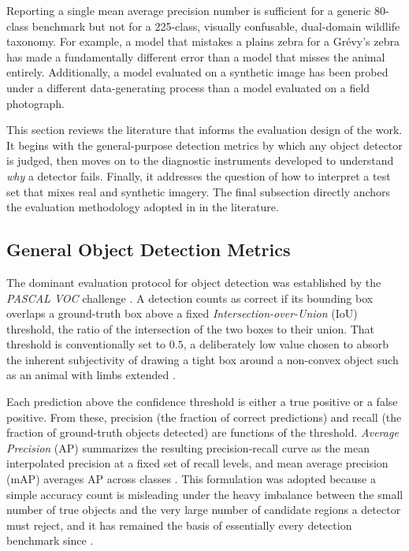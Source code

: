 Reporting a single mean average precision number is sufficient for a generic 80-class benchmark but not for a 225-class, visually confusable, dual-domain wildlife taxonomy. For example, a model that mistakes a plains zebra for a Grévy's zebra has made a fundamentally different error than a model that misses the animal entirely. Additionally, a model evaluated on a synthetic image has been probed under a different data-generating process than a model evaluated on a field photograph.

This section reviews the literature that informs the evaluation design of the work. It begins with the general-purpose detection metrics by which any object detector is judged, then moves on to the diagnostic instruments developed to understand \textit{why} a detector fails. Finally, it addresses the question of how to interpret a test set that mixes real and synthetic imagery. The final subsection directly anchors the evaluation methodology adopted in  in the literature.

\subsection{General Object Detection Metrics}\label{sec:lit_detection_metrics}

The dominant evaluation protocol for object detection was established by the \textit{PASCAL VOC} challenge \cite{everinghamPascalVisualObject2010}. A detection counts as correct if its bounding box overlaps a ground-truth box above a fixed \textit{Intersection-over-Union} (IoU) threshold, the ratio of the intersection of the two boxes to their union. That threshold is conventionally set to $0.5$, a deliberately low value chosen to absorb the inherent subjectivity of drawing a tight box around a non-convex object such as an animal with limbs extended \cite{everinghamPascalVisualObject2010}.

Each prediction above the confidence threshold is either a true positive or a false positive. From these, precision (the fraction of correct predictions) and recall (the fraction of ground-truth objects detected) are functions of the threshold. \textit{Average Precision} (AP) summarizes the resulting precision-recall curve as the mean interpolated precision at a fixed set of recall levels, and mean average precision (mAP) averages AP across classes \cite{everinghamPascalVisualObject2010}. This formulation was adopted because a simple accuracy count is misleading under the heavy imbalance between the small number of true objects and the very large number of candidate regions a detector must reject, and it has remained the basis of essentially every detection benchmark since \cite{everinghamPascalVisualObject2010,zouObjectDetection202023}.

